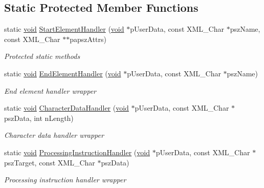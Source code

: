 \subsection*{\-Static \-Protected \-Member \-Functions}
\begin{DoxyCompactItemize}
\item 
static \hyperlink{_cpclient_8h_a6464f7480a0fd0ee170cba12b2c0497f}{void} \hyperlink{class_c_expat_impl_a8c96098c7f6b94fb2738a96b9cbfc344}{\-Start\-Element\-Handler} (\hyperlink{_cpclient_8h_a6464f7480a0fd0ee170cba12b2c0497f}{void} $\ast$p\-User\-Data, const \-X\-M\-L\-\_\-\-Char $\ast$psz\-Name, const \-X\-M\-L\-\_\-\-Char $\ast$$\ast$papsz\-Attrs)
\begin{DoxyCompactList}\small\item\em \-Protected static methods \end{DoxyCompactList}\item 
static \hyperlink{_cpclient_8h_a6464f7480a0fd0ee170cba12b2c0497f}{void} \hyperlink{class_c_expat_impl_a89960971577a2468c5b843d6b5f55481}{\-End\-Element\-Handler} (\hyperlink{_cpclient_8h_a6464f7480a0fd0ee170cba12b2c0497f}{void} $\ast$p\-User\-Data, const \-X\-M\-L\-\_\-\-Char $\ast$psz\-Name)
\begin{DoxyCompactList}\small\item\em \-End element handler wrapper \end{DoxyCompactList}\item 
static \hyperlink{_cpclient_8h_a6464f7480a0fd0ee170cba12b2c0497f}{void} \hyperlink{class_c_expat_impl_a75e43c0f3bc1a40e9e607995002cecad}{\-Character\-Data\-Handler} (\hyperlink{_cpclient_8h_a6464f7480a0fd0ee170cba12b2c0497f}{void} $\ast$p\-User\-Data, const \-X\-M\-L\-\_\-\-Char $\ast$psz\-Data, int n\-Length)
\begin{DoxyCompactList}\small\item\em \-Character data handler wrapper \end{DoxyCompactList}\item 
static \hyperlink{_cpclient_8h_a6464f7480a0fd0ee170cba12b2c0497f}{void} \hyperlink{class_c_expat_impl_ab619ebaabbc0acc4cb07a52b24018cd3}{\-Processing\-Instruction\-Handler} (\hyperlink{_cpclient_8h_a6464f7480a0fd0ee170cba12b2c0497f}{void} $\ast$p\-User\-Data, const \-X\-M\-L\-\_\-\-Char $\ast$psz\-Target, const \-X\-M\-L\-\_\-\-Char $\ast$psz\-Data)
\begin{DoxyCompactList}\small\item\em \-Processing instruction handler wrapper \end{DoxyCompactList}\item 
$$
\end{DoxyCompactItemize}
